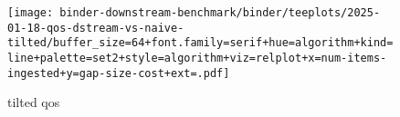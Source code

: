 \begin{figure}
\texttt{[image: binder-downstream-benchmark/binder/teeplots/2025-01-18-qos-dstream-vs-naive-tilted/buffer\_size=64+font.family=serif+hue=algorithm+kind=line+palette=set2+style=algorithm+viz=relplot+x=num-items-ingested+y=gap-size-cost+ext=.pdf]}
\caption{tilted qos}
\label{fig:tilted-qos}
\end{figure}
